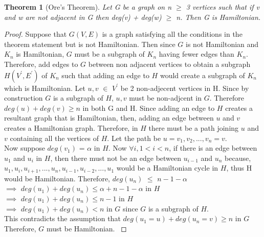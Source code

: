 \documentclass[12pt]{article}
\newtheorem{theorem}[definition]{Theorem}
\numberwithin{equation}{subsection}
\numberwithin{table}{subsection}
\begin{document}
\begin{theorem}[Ore's Theorem]
\label{ore's theorem}
Let G be a graph on n $\geq$ 3 vertices such that if v and w are not adjacent in G then deg(v) + deg(w) $\geq$ n. Then G is Hamiltonian. {}
\end{theorem}
\begin{proof}
Suppose that $\mathit{G(V,E)}$ is a graph satisfying all the conditions in the theorem statement but is not Hamiltonian. Then since $\mathit{G}$ is not Hamiltonian and $K_n$ is Hamiltonian, $\mathit{G}$ must be a subgraph of $\mathit{K_n}$ having fewer edges than $\mathit{K_n}$. Therefore, add edges to $\mathit{G}$ between non adjacent vertices to obtain a subgraph $\mathit{H(V^\prime,E^\prime)}$ of $\mathit{K_n}$ such that adding an edge to $\mathit{H}$ would create a subgraph of $\mathit{K_n}$ which is Hamiltonian. Let $\mathit{u, v}$ $\in$ $V^\prime$ be 2 non-adjecent vertices in H. Since by construction $\mathit{G}$ is a subgraph of $\mathit{H}$, $\mathit{u, v}$ must be non-adjcent in $\mathit{G}$. Therefore $\mathit{deg(u) + deg(v) \geq n}$ in both G and H. Since adding an edge to $\mathit{H}$ creates a resultant graph that is Hamiltonian, then, adding an edge between $\mathit{u}$ and $\mathit{v}$ creates a Hamiltonian graph. Therefore, in $\mathit{H}$ there must be a path joining $\mathit{u}$ and $\mathit{v}$ containing all the vertices of $\mathit{H}$. Let the path be $\mathit{u = v_1, v_2, ..., v_n = v}$.\\
Now suppose $\mathit{deg(v_1)}$ = $\alpha$ in $\mathit{H}$. Now $\forall \mathit{i}, 1 <  i < \mathit{n}$, if there is an edge between $\mathit{u_1}$ and $\mathit{u_i}$ in $\mathit{H}$, then there must not be an edge between $\mathit{u_{i-1}}$ and $\mathit{u_n}$ because, $\mathit{u_1, u_i, u_{i+1}, ..., u_n, u_{i-1}, u_{i-2}, ..., u_1}$ would be a Hamiltonian cycle in $\mathit{H}$, thus H would be Hamiltonian. Therefore, $\mathit{deg(u_n)}$ $\leq$ $\mathit{n-1-\alpha}$\\
$\implies$ $\mathit{deg(u_1) + deg(u_n) \leq \alpha +  n-1 - \alpha}$ in $\mathit{H}$\\
$\implies$ $\mathit{deg(u_1) + deg(u_n) \leq n-1}$ in $\mathit{H}$\\
$\implies$ $\mathit{deg(u_1) + deg(u_n) < n}$ in $\mathit{G}$ since $\mathit{G}$ is a subgraph of $\mathit{H}$.\\
This contradicts the assumption that $\mathit{deg(u_1 = u) + deg(u_n = v) \geq n}$ in $\mathit{G}$ \\
Therefore, $\mathit{G}$ must be Hamiltonian. \cite{ray_2013}
\end{proof}
\end{document}

